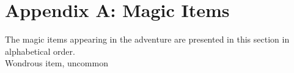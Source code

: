 \documentclass[module]{subfiles}
\begin{document}
\selectfont
\clearpage

\chapter{Appendix A: Magic Items}

The magic items appearing in the adventure are presented in this section in alphabetical order.\\

{Wondrous item, uncommon}

\lipsum[1]
\end{document}
